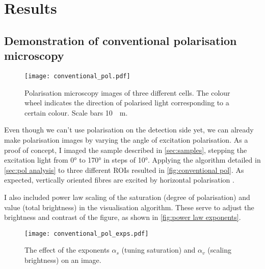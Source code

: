 \chapter{Results}

\section{Demonstration of conventional polarisation microscopy}
\label{sec:conventional pol}

\begin{figure}
	\centering
	\texttt{[image: conventional\_pol.pdf]}
	\caption{
		Polarisation microscopy images of three different cells. The colour wheel indicates the direction of polarised light corresponding to a certain colour. Scale bars \SI{10}{\mu m}. 
	}
	\label{fig:conventional pol}
\end{figure}

Even though we can't use polarisation on the detection side yet, we can already make polarisation images by varying the angle of excitation polarisation. As a proof of concept, I imaged the sample described in \autoref{sec:samples}, stepping the excitation light from \ang{0} to \ang{170} in steps of \ang{10}. Applying the algorithm detailed in \autoref{sec:pol analysis} to three different ROIs resulted in \autoref{fig:conventional pol}. As expected, vertically oriented fibres are excited by horizontal polarisation \cite{Spira2017}.

I also included power law scaling of the saturation (degree of polarisation) and value (total brightness) in the visualisation algorithm. These serve to adjust the brightness and contrast of the figure, as shown in \autoref{fig:power law exponents}.

\begin{figure}
	\centering
	\texttt{[image: conventional\_pol\_exps.pdf]}
	\caption{
		The effect of the exponents $ \alpha_s $ (tuning saturation) and $ \alpha_v $ (scaling brightness) on an image.
	}
	\label{fig:power law exponents}
\end{figure}



